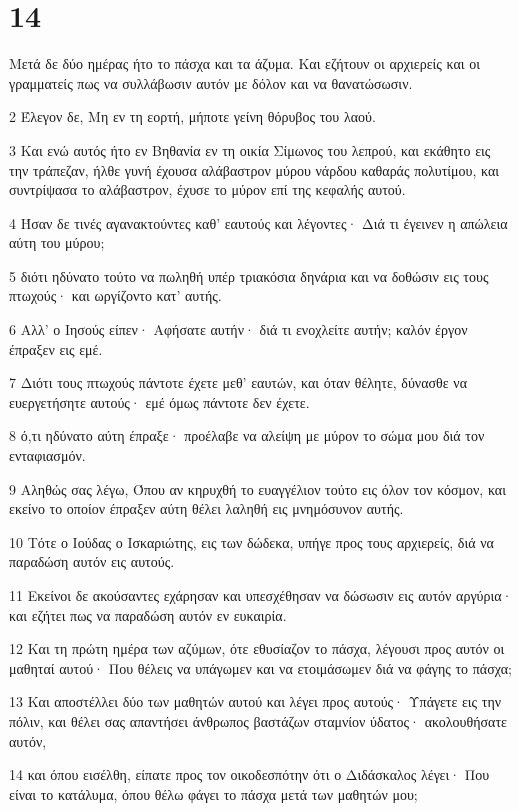 \chapter{14}

\par Μετά δε δύο ημέρας ήτο το πάσχα και τα άζυμα. Και εζήτουν οι αρχιερείς και οι γραμματείς πως να συλλάβωσιν αυτόν με δόλον και να θανατώσωσιν.
\par 2 Έλεγον δε, Μη εν τη εορτή, μήποτε γείνη θόρυβος του λαού.
\par 3 Και ενώ αυτός ήτο εν Βηθανία εν τη οικία Σίμωνος του λεπρού, και εκάθητο εις την τράπεζαν, ήλθε γυνή έχουσα αλάβαστρον μύρου νάρδου καθαράς πολυτίμου, και συντρίψασα το αλάβαστρον, έχυσε το μύρον επί της κεφαλής αυτού.
\par 4 Ήσαν δε τινές αγανακτούντες καθ' εαυτούς και λέγοντες· Διά τι έγεινεν η απώλεια αύτη του μύρου;
\par 5 διότι ηδύνατο τούτο να πωληθή υπέρ τριακόσια δηνάρια και να δοθώσιν εις τους πτωχούς· και ωργίζοντο κατ' αυτής.
\par 6 Αλλ' ο Ιησούς είπεν· Αφήσατε αυτήν· διά τι ενοχλείτε αυτήν; καλόν έργον έπραξεν εις εμέ.
\par 7 Διότι τους πτωχούς πάντοτε έχετε μεθ' εαυτών, και όταν θέλητε, δύνασθε να ευεργετήσητε αυτούς· εμέ όμως πάντοτε δεν έχετε.
\par 8 ό,τι ηδύνατο αύτη έπραξε· προέλαβε να αλείψη με μύρον το σώμα μου διά τον ενταφιασμόν.
\par 9 Αληθώς σας λέγω, Όπου αν κηρυχθή το ευαγγέλιον τούτο εις όλον τον κόσμον, και εκείνο το οποίον έπραξεν αύτη θέλει λαληθή εις μνημόσυνον αυτής.
\par 10 Τότε ο Ιούδας ο Ισκαριώτης, εις των δώδεκα, υπήγε προς τους αρχιερείς, διά να παραδώση αυτόν εις αυτούς.
\par 11 Εκείνοι δε ακούσαντες εχάρησαν και υπεσχέθησαν να δώσωσιν εις αυτόν αργύρια· και εζήτει πως να παραδώση αυτόν εν ευκαιρία.
\par 12 Και τη πρώτη ημέρα των αζύμων, ότε εθυσίαζον το πάσχα, λέγουσι προς αυτόν οι μαθηταί αυτού· Που θέλεις να υπάγωμεν και να ετοιμάσωμεν διά να φάγης το πάσχα;
\par 13 Και αποστέλλει δύο των μαθητών αυτού και λέγει προς αυτούς· Υπάγετε εις την πόλιν, και θέλει σας απαντήσει άνθρωπος βαστάζων σταμνίον ύδατος· ακολουθήσατε αυτόν,
\par 14 και όπου εισέλθη, είπατε προς τον οικοδεσπότην ότι ο Διδάσκαλος λέγει· Που είναι το κατάλυμα, όπου θέλω φάγει το πάσχα μετά των μαθητών μου;
